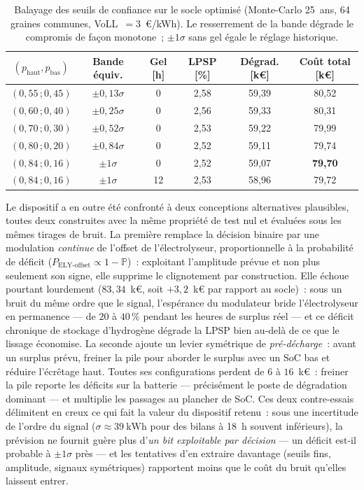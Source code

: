\begin{table}[h!]
\centering
\caption{Balayage des seuils de confiance sur le socle optimisé (Monte-Carlo 25~ans, 64 graines communes, VoLL~$=3$~€/kWh). Le resserrement de la bande dégrade le compromis de façon monotone~; $\pm 1\sigma$ sans gel égale le réglage historique.}
\label{tab:proba_sweep}
\begin{tabular}{cccccc}
\hline
$(p_{\text{haut}}, p_{\text{bas}})$ & Bande équiv. & Gel [h] & LPSP [\%] & Dégrad. [k€] & Coût total [k€] \\
\hline
$(0{,}55\,; 0{,}45)$ & $\pm 0{,}13\sigma$ & 0  & 2,58 & 59,39 & 80,52 \\
$(0{,}60\,; 0{,}40)$ & $\pm 0{,}25\sigma$ & 0  & 2,56 & 59,33 & 80,31 \\
$(0{,}70\,; 0{,}30)$ & $\pm 0{,}52\sigma$ & 0  & 2,53 & 59,22 & 79,99 \\
$(0{,}80\,; 0{,}20)$ & $\pm 0{,}84\sigma$ & 0  & 2,52 & 59,11 & 79,74 \\
$(0{,}84\,; 0{,}16)$ & $\pm 1\sigma$      & 0  & 2,52 & 59,07 & \textbf{79,70} \\
$(0{,}84\,; 0{,}16)$ & $\pm 1\sigma$      & 12 & 2,53 & 58,96 & 79,72 \\
\hline
\end{tabular}
\end{table}

Le dispositif a en outre été confronté à deux conceptions alternatives plausibles, toutes deux construites avec la même propriété de test nul et évaluées sous les mêmes tirages de bruit. La première remplace la décision binaire par une modulation \emph{continue} de l'offset de l'électrolyseur, proportionnelle à la probabilité de déficit ($P_{\text{ELY-offset}} \propto 1 - \mathbb{P}$)~: exploitant l'amplitude prévue et non plus seulement son signe, elle supprime le clignotement par construction. Elle échoue pourtant lourdement ($83{,}34$~k€, soit $+3{,}2$~k€ par rapport au socle)~: sous un bruit du même ordre que le signal, l'espérance du modulateur bride l'électrolyseur en permanence — de $20$ à $40\,\%$ pendant les heures de surplus réel — et ce déficit chronique de stockage d'hydrogène dégrade la LPSP bien au-delà de ce que le lissage économise. La seconde ajoute un levier symétrique de \emph{pré-décharge}~: avant un surplus prévu, freiner la pile pour aborder le surplus avec un SoC bas et réduire l'écrêtage haut. Toutes ses configurations perdent de $6$ à $16$~k€~: freiner la pile reporte les déficits sur la batterie — précisément le poste de dégradation dominant — et multiplie les passages au plancher de SoC. Ces deux contre-essais délimitent en creux ce qui fait la valeur du dispositif retenu~: sous une incertitude de l'ordre du signal ($\sigma \approx \SI{39}{\kilo\watt\hour}$ pour des bilans à \SI{18}{\hour} souvent inférieurs), la prévision ne fournit guère plus d'\emph{un bit exploitable par décision} — un déficit est-il probable à $\pm 1\sigma$ près — et les tentatives d'en extraire davantage (seuils fins, amplitude, signaux symétriques) rapportent moins que le coût du bruit qu'elles laissent entrer.

